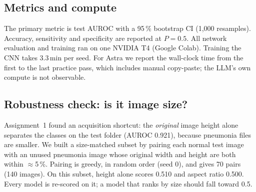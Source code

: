 \subsection{Metrics and compute}
The primary metric is test AUROC with a 95\,\% bootstrap CI (1,000 resamples).
Accuracy, sensitivity and specificity are reported at $P{=}0.5$.
All network evaluation and training ran on one NVIDIA T4 (Google Colab).
Training the CNN takes 3.3\,min per seed.
For Astra we report the wall-clock time from the first to the last practice pass, which includes manual copy-paste; the LLM's own compute is not observable.

\subsection{Robustness check: is it image size?}
Assignment~1 found an acquisition shortcut: the \emph{original} image height alone separates the classes on the test folder (AUROC 0.921), because pneumonia files are smaller.
We built a size-matched subset by pairing each normal test image with an unused pneumonia image whose original width and height are both within $\approx$5\,\%.
Pairing is greedy, in random order (seed 0), and gives 70 pairs (140 images).
On this subset, height alone scores 0.510 and aspect ratio 0.500.
Every model is re-scored on it; a model that ranks by size should fall toward 0.5.

